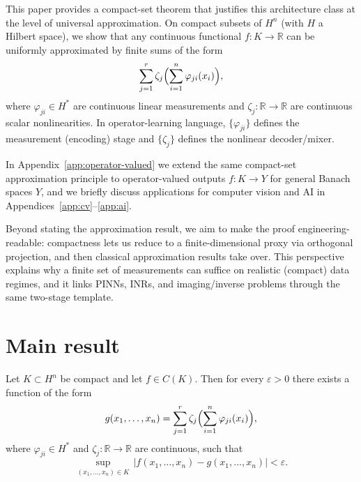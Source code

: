 \documentclass[final,12pt]{colt2026} %
\begin{document}
This paper provides a compact-set theorem that justifies this architecture class at the level of universal approximation. On compact subsets of $H^n$ (with $H$ a Hilbert space), we show that any continuous functional $f\colon K\to\mathbb{R}$ can be uniformly approximated by finite sums of the form
\[
  \sum_{j=1}^r \zeta_j\Bigl(\sum_{i=1}^n \varphi_{ji}(x_i)\Bigr),
\]
where $\varphi_{ji}\in H^*$ are continuous linear measurements and $\zeta_j\colon\mathbb{R}\to\mathbb{R}$ are continuous scalar nonlinearities. In operator-learning language, $\{\varphi_{ji}\}$ defines the measurement (encoding) stage and $\{\zeta_j\}$ defines the nonlinear decoder/mixer.

In Appendix~\ref{app:operator-valued} we extend the same compact-set approximation principle to operator-valued outputs $f\colon K\to Y$ for general Banach spaces $Y$, and we briefly discuss applications for computer vision and AI in Appendices~\ref{app:cv}--\ref{app:ai}.

Beyond stating the approximation result, we aim to make the proof engineering-readable: compactness lets us reduce to a finite-dimensional proxy via orthogonal projection, and then classical approximation results take over. This perspective explains why a finite set of measurements can suffice on realistic (compact) data regimes, and it links PINNs, INRs, and imaging/inverse problems through the same two-stage template.

\section{Main result}


\medskip



\begin{theorem}
Let $K\subset H^n$ be compact and let $f\in C(K)$. Then for every $\varepsilon>0$ there exists a function of the form
\[
  g(x_1,\dots,x_n)=\sum_{j=1}^r \zeta_j\Bigl(\sum_{i=1}^n \varphi_{ji}(x_i)\Bigr),
\]
where $\varphi_{ji}\in H^*$ and $\zeta_j\colon\mathbb{R}\to\mathbb{R}$ are continuous, such that
\[
  \sup_{(x_1,\dots,x_n)\in K}\,|f(x_1,\dots,x_n)-g(x_1,\dots,x_n)|<\varepsilon.
\]
\end{theorem}
\end{document}
